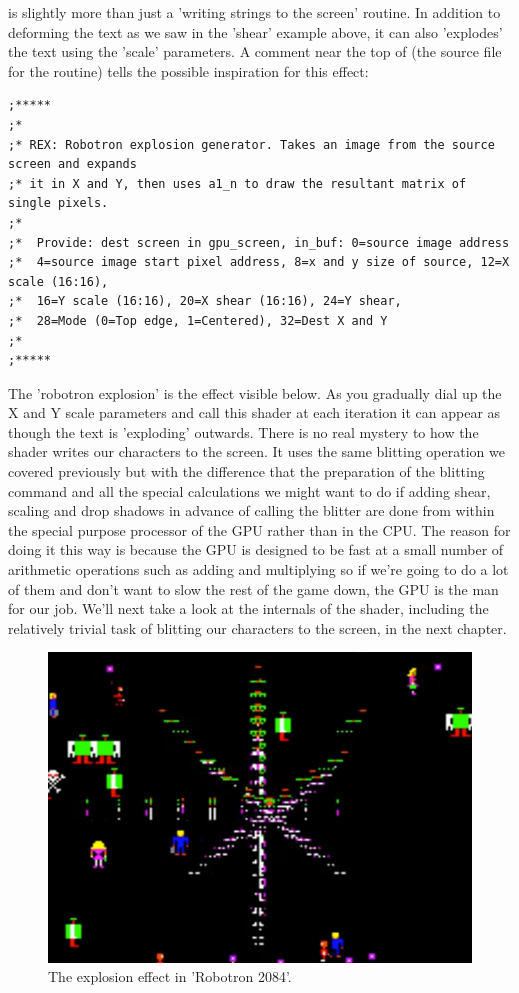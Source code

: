  is slightly more than just a 'writing strings to the screen' routine. In addition to deforming the text as we saw in the
'shear' example above, it can also 'explodes' the text using the 'scale' parameters. A comment near the top of  (the
source file for the  routine) tells the possible inspiration for this effect:

\begin{lstlisting}
;*****
;*
;* REX: Robotron explosion generator. Takes an image from the source screen and expands
;* it in X and Y, then uses a1_n to draw the resultant matrix of single pixels.
;*
;*  Provide: dest screen in gpu_screen, in_buf: 0=source image address
;*  4=source image start pixel address, 8=x and y size of source, 12=X scale (16:16),
;*  16=Y scale (16:16), 20=X shear (16:16), 24=Y shear,
;*  28=Mode (0=Top edge, 1=Centered), 32=Dest X and Y 
;*
;*****
\end{lstlisting}

The 'robotron explosion' is the effect visible below. As you gradually dial up the X and Y scale parameters and call this shader at each
iteration it can appear as though the text is 'exploding' outwards. There is no real mystery to how the shader writes our characters
to the screen. It uses the same blitting operation we covered previously but with the difference that the preparation of the blitting command
and all the special calculations we might want to do if adding shear, scaling and drop shadows in advance of calling the blitter are done from
within the special purpose processor of the GPU rather than in the CPU. The reason for doing it this way is because the GPU is designed to be fast
at a small number of arithmetic operations such as adding and multiplying so if we're going to do a lot of them and don't want to slow the
rest of the game down, the GPU is the man for our job. We'll next take a look at the internals of the  shader, including the 
relatively trivial task of blitting our characters to the screen, in the next chapter.

\begin{figure}[H]
    \centering
    \begin{adjustbox}{width=9cm,center}
      \includegraphics[width=12cm]{src/characters/robotron.png}%
    \end{adjustbox}
\caption{The explosion effect in 'Robotron 2084'.}
\end{figure}


